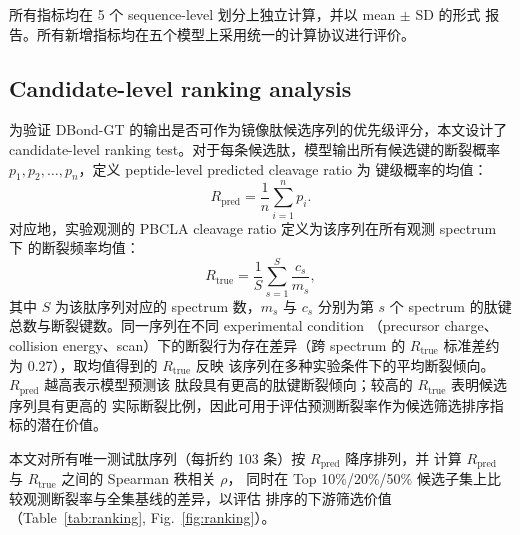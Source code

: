 所有指标均在 5 个 sequence-level 划分上独立计算，并以 mean $\pm$ SD 的形式
报告。所有新增指标均在五个模型上采用统一的计算协议进行评价。

\subsection{Candidate-level ranking analysis}
\label{sec:candidate_ranking}

为验证 DBond-GT 的输出是否可作为镜像肽候选序列的优先级评分，本文设计了
candidate-level ranking test。对于每条候选肽，模型输出所有候选键的断裂概率
$p_1, p_2, \ldots, p_{n}$，定义 peptide-level predicted cleavage ratio 为
键级概率的均值：
\begin{equation}
    R_{\text{pred}} = \frac{1}{n}\sum_{i=1}^{n} p_i.
    \label{eq:rpred}
\end{equation}
对应地，实验观测的 PBCLA cleavage ratio 定义为该序列在所有观测 spectrum 下
的断裂频率均值：
\begin{equation}
    R_{\text{true}} = \frac{1}{S}\sum_{s=1}^{S} \frac{c_s}{m_s},
    \label{eq:rtrue}
\end{equation}
其中 $S$ 为该肽序列对应的 spectrum 数，$m_s$ 与 $c_s$ 分别为第 $s$ 个
spectrum 的肽键总数与断裂键数。同一序列在不同 experimental condition
（precursor charge、collision energy、scan）下的断裂行为存在差异（跨 spectrum
的 $R_{\text{true}}$ 标准差约为 0.27），取均值得到的 $R_{\text{true}}$ 反映
该序列在多种实验条件下的平均断裂倾向。$R_{\text{pred}}$ 越高表示模型预测该
肽段具有更高的肽键断裂倾向；较高的 $R_{\text{true}}$ 表明候选序列具有更高的
实际断裂比例，因此可用于评估预测断裂率作为候选筛选排序指标的潜在价值。

本文对所有唯一测试肽序列（每折约 103 条）按 $R_{\text{pred}}$ 降序排列，并
计算 $R_{\text{pred}}$ 与 $R_{\text{true}}$ 之间的 Spearman 秩相关 $\rho$，
同时在 Top 10\%/20\%/50\% 候选子集上比较观测断裂率与全集基线的差异，以评估
排序的下游筛选价值（Table~\ref{tab:ranking}, Fig.~\ref{fig:ranking}）。

